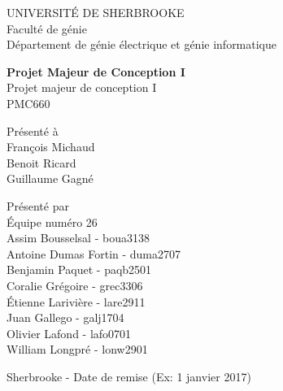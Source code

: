 {\centering
UNIVERSITÉ DE SHERBROOKE \\
Faculté de génie \\
Département de génie électrique et génie informatique \\
\vfill

{\LARGE
\textbf{Projet Majeur de Conception I} \\
}
\vfill
Projet majeur de conception I\\
PMC660\\
\vfill

Présenté à \\
François Michaud \\
Benoit Ricard \\
Guillaume Gagné \\
\vfill

Présenté par \\
Équipe numéro 26\\
Assim Bousselsal - boua3138\\
Antoine Dumas Fortin - duma2707\\
Benjamin Paquet - paqb2501\\
Coralie Grégoire - grec3306\\
Étienne Larivière - lare2911\\
Juan Gallego - galj1704\\
Olivier Lafond - lafo0701\\
William Longpré - lonw2901\\
\vfill

{\large
Sherbrooke - Date de remise (Ex: 1 janvier 2017) \\
}
}
